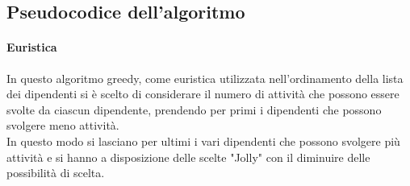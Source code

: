 \subsection{Pseudocodice dell'algoritmo}


\noindent
\paragraph{Euristica}
In questo algoritmo greedy, come euristica utilizzata nell'ordinamento della lista dei dipendenti si è scelto di considerare il numero di attività che possono essere svolte da ciascun dipendente, prendendo per primi i dipendenti che possono svolgere meno attività.\\
In questo modo si lasciano per ultimi i vari dipendenti che possono svolgere più attività e si hanno a disposizione delle scelte "Jolly" con il diminuire delle possibilità di scelta.

